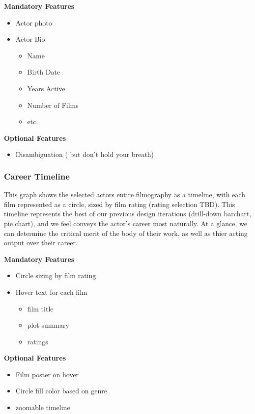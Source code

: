 \documentclass[12pt]{article}
\begin{document}
 \vspace{2em}
 
 \textbf{Mandatory Features}
 \begin{itemize}
  	\item Actor photo
  	\item Actor Bio
  	\begin{itemize}
  		\item Name
  		\item Birth Date
  		\item Years Active
  		\item Number of Films
  		\item etc.
  	\end{itemize}
  	
 \end{itemize}

\vspace{2em}
 
 \textbf{Optional Features}
\begin{itemize}
	\item Disambiguation ( but don't hold your breath)
\end{itemize}
\subsubsection{Career Timeline}
This graph shows the selected actors entire filmography as a timeline, with each film represented as a circle, sized by film rating (rating selection TBD). This timeline represents the best of our previous design iterations (drill-down barchart, pie chart), and we feel conveys the actor's career most naturally.  At a glance, we can determine the critical merit of the body of their work, as well as thier acting output over their career.

\vspace{2em}
\textbf{Mandatory Features}
\begin{itemize}
 	\item Circle sizing by film rating
 	\item Hover text for each film
 		\begin{itemize}
 			\item film title
 			\item plot summary
 			\item ratings
 		\end{itemize}

 \end{itemize} 
 
 \textbf{Optional Features}
\begin{itemize}
\item 	Film poster on hover 
\item Circle fill color based on genre
\item zoomable timeline
\end{itemize}
\newpage
\end{document}
